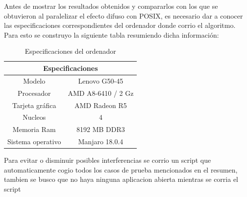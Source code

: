 \documentclass{IEEEtran}
\begin{document}
Antes de mostrar los resultados obtenidos y compararlos con los que se obtuvieron al paralelizar el efecto difuso con POSIX, es necesario dar a conocer las especificaciones correspondientes del ordenador donde corrio el algoritmo. Para esto se construyo la siguiente tabla resumiendo dicha información:

\begin{table}[H]
\centering
    \begin{tabular}{ |c|c| } 
\hline
\multicolumn{2}{|c|}{Especificaciones} \\
\hline
Modelo & Lenovo G50-45\\
 \hline
 Procesador & AMD A8-6410 / 2 Gz \\ 
 \hline
 Tarjeta gráfica & AMD Radeon R5 \\ 
 \hline
 Nucleos & 4\\ 
 \hline
 Memoria Ram & 8192 MB DDR3
 \\ 
 \hline
 Sistema operativo & Manjaro 18.0.4 \\ 
 \hline
\end{tabular}
\caption{Especificaciones del ordenador}
\end{table}

Para evitar o disminuir posibles interferencias se corrio un script que automaticamente cogio todos los casos de prueba mencionados en el resumen, tambien se busco que no haya ninguna aplicacion abierta mientras se corria el script
\end{document}
